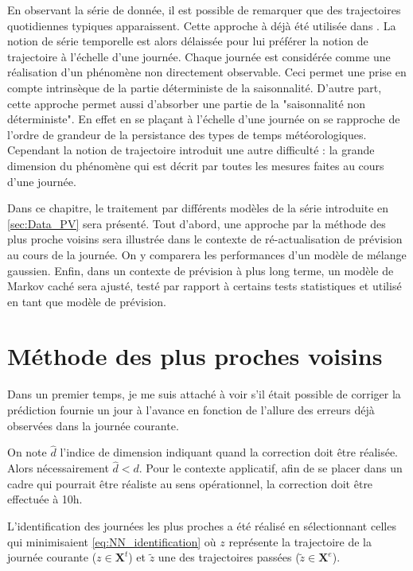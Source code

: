 \documentclass[12pt, french]{report}
\begin{document}
En observant la série de donnée, il est possible de remarquer que des trajectoires quotidiennes typiques apparaissent. Cette approche à déjà été utilisée dans \cite{latimier_gestion_2016}. La notion de série temporelle est alors délaissée pour lui préférer la notion de trajectoire à l'échelle d'une journée. Chaque journée est considérée comme une réalisation d'un phénomène non directement observable. Ceci permet une prise en compte intrinsèque de la partie déterministe de la saisonnalité. D'autre part, cette approche permet aussi d'absorber une partie de la "saisonnalité non déterministe". En effet en se plaçant à l'échelle d'une journée on se rapproche de l'ordre de grandeur de la persistance des types de temps météorologiques. Cependant la notion de trajectoire introduit une autre difficulté : la grande dimension du phénomène qui est décrit par toutes les mesures faites au cours d'une journée.

Dans ce chapitre, le traitement par différents modèles de la série introduite en \ref{sec:Data_PV} sera présenté. Tout d'abord, une approche par la méthode des plus proche voisins sera illustrée dans le contexte de ré-actualisation de prévision au cours de la journée. On y comparera les performances d'un modèle de mélange gaussien. Enfin, dans un contexte de prévision à plus long terme, un modèle de Markov caché sera ajusté, testé par rapport à certains tests statistiques et utilisé en tant que modèle de prévision.

\section{Méthode des plus proches voisins}
Dans un premier temps, je me suis attaché à voir s'il était possible de corriger la prédiction fournie un jour à l'avance en fonction de l'allure des erreurs déjà observées dans la journée courante.

On note $\widehat{d}$ l'indice de dimension indiquant quand la correction doit être réalisée. Alors nécessairement $\widehat{d} < d$. Pour le contexte applicatif, afin de se placer dans un cadre qui pourrait être réaliste au sens opérationnel, la correction doit être effectuée à 10h.

L'identification des journées les plus proches a été réalisé en sélectionnant celles qui minimisaient \eqref{eq:NN_identification} où $z$ représente la trajectoire de la journée courante ($z \in \bm{X}^t$) et $\widetilde{z}$ une des trajectoires passées ($\widetilde{z} \in \bm{X}^e$). 
\end{document}
